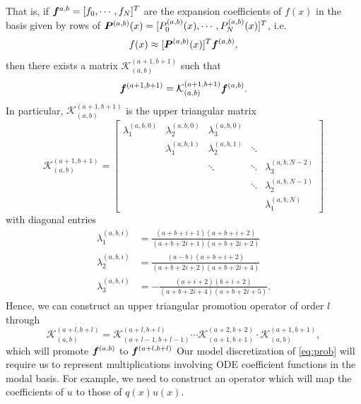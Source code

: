 That is, if $\boldsymbol{f}^{a,b} = [f_0,\cdots,f_N]^T$ are the expansion coefficients of $f(x)$ in the basis given by rows of $\boldsymbol{P}^{(a,b)}(x) = [P_0^{(a,b)}(x),\cdots,P_N^{(a,b)}(x)]^T$, i.e. $$f(x) \approx [\boldsymbol{P}^{(a,b)}(x)]^T\boldsymbol{f}^{(a,b)} ,$$
then there exists a matrix $\mathcal{K}_{(a,b)}^{(a+1,b+1)}$ such that
\begin{equation}
	\boldsymbol{f}^{(a+1,b+1)} = \mathcal{K}_{(a,b)}^{(a+1,b+1)}\boldsymbol{f}^{(a,b)}.
\end{equation}
In particular, $\mathcal{K}_{(a,b)}^{(a+1,b+1)}$ is the upper triangular matrix
\begin{equation}
\mathcal{K}_{(a,b)}^{(a+1,b+1)}	= \begin{bmatrix}
		\lambda_1^{(a,b,0)} & \lambda_2^{(a,b,0)} & \lambda_3^{(a,b,0)} & &\\
		& \lambda_1^{(a,b,1)} & \lambda_2^{(a,b,1)} & \ddots &\\
		& & \ddots & \ddots & \lambda_3^{(a,b,N-2)}\\
		& & & \ddots & \lambda_2^{(a,b,N-1)} \\
		& & & & \lambda_1^{(a,b,N)}
	\end{bmatrix}
\end{equation}
with diagonal entries
\begin{equation}
	\begin{split}
		\lambda_1^{(a,b,i)} &= \frac{(a+b+i+1)(a+b+i+2)}{(a+b+2i+1)(a+b+2i+2)}\\
		\lambda_2^{(a,b,i)} &= \frac{(a-b)(a+b+i+2)}{(a+b+2i+2)(a+b+2i+4)}\\
		\lambda_3^{(a,b,i)} &= -\frac{(a+i+2)(b+i+2)}{(a+b+2i+4)(a+b+2i+5)}.
	\end{split}
\end{equation}
Hence, we can construct an upper triangular promotion operator of order $l$ through
\begin{equation}
	\mathcal{K}_{(a,b)}^{(a+l,b+l)}  = \mathcal{K}_{(a+l-1,b+l-1)}^{(a+l,b+l)}\cdots \mathcal{K}_{(a+1,b+1)}^{(a+2,b+2)}\cdot \mathcal{K}_{(a,b)}^{(a+1,b+1)},
\end{equation}
which will promote $\boldsymbol{f}^{(a,b)}$ to $\boldsymbol{f}^{(a+l,b+l)}$
Our model discretization of \eqref{eq:prob} will require us to represent multiplications involving ODE coefficient functions in the modal basis. For example, we need to construct an operator which will map the coefficients of $u$ to those of $q(x)u(x)$. 

